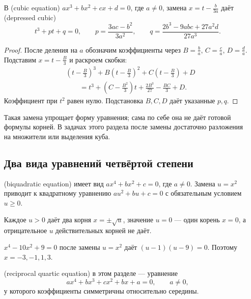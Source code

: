 \begin{theorem}\label{thm:legacy-c11-4}
В  (cubic equation)
\(ax^3+bx^2+cx+d=0\), где \(a\neq0\), замена \(x=t-\frac{b}{3a}\) даёт  (depressed cubic)
\[
t^3+pt+q=0,\qquad
p=\frac{3ac-b^2}{3a^2},\qquad
q=\frac{2b^3-9abc+27a^2d}{27a^3}.
\]
\end{theorem}
\begin{proof}
После деления на \(a\) обозначим коэффициенты через \(B=\frac ba\), \(C=\frac ca\), \(D=\frac da\). Подставим \(x=t-\frac B3\) и раскроем скобки:
\[
\begin{aligned}
&\left(t-\frac B3\right)^3+B\left(t-\frac B3\right)^2+C\left(t-\frac B3\right)+D\\
&\qquad=t^3+\left(C-\frac{B^2}{3}\right)t+\frac{2B^3}{27}-\frac{BC}{3}+D.
\end{aligned}
\]
Коэффициент при \(t^2\) равен нулю. Подстановка \(B,C,D\) даёт указанные \(p,q\).
\end{proof}

Такая замена упрощает форму уравнения; сама по себе она не даёт готовой формулы корней. В задачах этого раздела после замены достаточно разложения на множители или выделения куба.

\subsection{Два вида уравнений четвёртой степени}
\begin{definition}
 (biquadratic equation) имеет вид \(ax^4+bx^2+c=0\), где \(a\neq0\). Замена \(u=x^2\) приводит к квадратному уравнению \(au^2+bu+c=0\) с обязательным условием \(u\geq0\).
\end{definition}
Каждое \(u>0\) даёт два корня \(x=\pm\sqrt u\), значение \(u=0\) — один корень \(x=0\), а отрицательное \(u\) действительных корней не даёт.

\begin{example}
\(x^4-10x^2+9=0\) после замены \(u=x^2\) даёт \((u-1)(u-9)=0\). Поэтому \(x=-3,-1,1,3\).
\end{example}

\begin{definition}
 (reciprocal quartic equation) в этом разделе — уравнение
\[
ax^4+bx^3+cx^2+bx+a=0,\qquad a\neq0,
\]
у которого коэффициенты симметричны относительно середины.
\end{definition}


